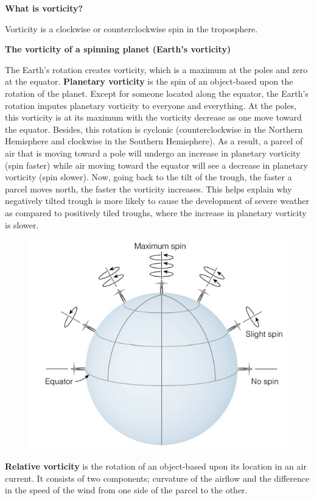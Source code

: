 \documentclass[12pt,oneside]{book}
\begin{document}
\textbf{What is vorticity?}

Vorticity is a clockwise or counterclockwise spin in the troposphere.

\textbf{The vorticity of a spinning planet (Earth's vorticity)}

The Earth's rotation creates vorticity, which is a maximum at the poles
and zero at the equator. \textbf{Planetary vorticity} is the spin of an
object-based upon the rotation of the planet. Except for someone located
along the equator, the Earth's rotation imputes planetary vorticity to
everyone and everything. At the poles, this vorticity is at its maximum
with the vorticity decrease as one move toward the equator. Besides,
this rotation is cyclonic (counterclockwise in the Northern Hemisphere
and clockwise in the Southern Hemisphere). As a result, a parcel of air
that is moving toward a pole will undergo an increase in planetary
vorticity (spin faster) while air moving toward the equator will see a
decrease in planetary vorticity (spin slower). Now, going back to the
tilt of the trough, the faster a parcel moves north, the faster the
vorticity increases. This helps explain why negatively tilted trough is
more likely to cause the development of severe weather as compared to
positively tiled troughs, where the increase in planetary vorticity is
slower.

\begin{figure}

{\centering \includegraphics[width=0.8\linewidth]{figures/Figure634a} 

}

\caption{ }\label{fig:Fig634a}
\end{figure}

\textbf{Relative vorticity} is the rotation of an object-based upon its
location in an air current. It consists of two components; curvature of
the airflow and the difference in the speed of the wind from one side of
the parcel to the other.
\end{document}
